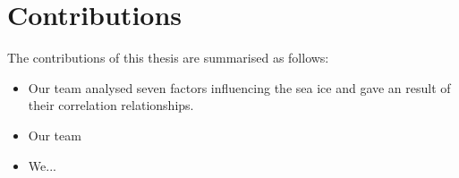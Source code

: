 \section{Contributions} %
The contributions of this thesis are summarised as follows: 
\begin{itemize}
  \item Our team analysed seven factors influencing the sea ice and gave an result of their correlation relationships.
  
  \item Our team
  
  \item We... 
\end{itemize}